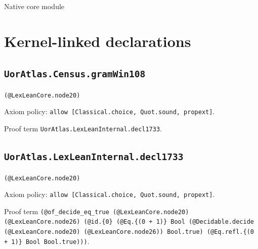 \documentclass[11pt]{article}
\begin{document}
\begin{center}{\LARGE Native core module}\end{center}
\section*{Kernel-linked declarations}
\subsection*{\texttt{UorAtlas.Census.gramWin108}}
\noindent\texttt{(@LexLeanCore.node20)}\par
\noindent Axiom policy: \texttt{allow [Classical.choice, Quot.sound, propext]}.\par
\noindent Proof term \texttt{UorAtlas.LexLeanInternal.decl1733}.\par
\subsection*{\texttt{UorAtlas.LexLeanInternal.decl1733}}
\noindent\texttt{(@LexLeanCore.node20)}\par
\noindent Axiom policy: \texttt{allow [Classical.choice, Quot.sound, propext]}.\par
\noindent Proof term \texttt{(@of\_decide\_eq\_true (@LexLeanCore.node20) (@LexLeanCore.node26) (@id.\{0\} (@Eq.\{(0 + 1)\} Bool (@Decidable.decide (@LexLeanCore.node20) (@LexLeanCore.node26)) Bool.true) (@Eq.refl.\{(0 + 1)\} Bool Bool.true)))}.\par
\end{document}
